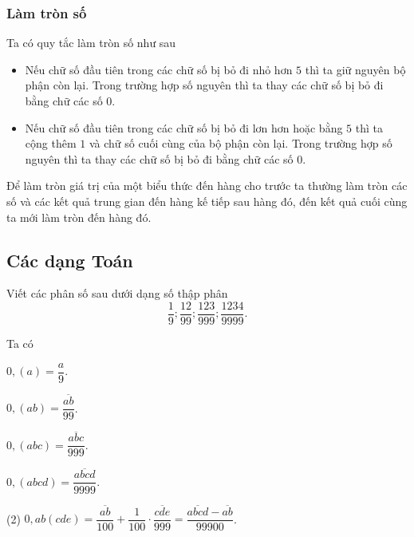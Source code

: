\subsubsection{Làm tròn số}
Ta có quy tắc làm tròn số như sau
\begin{itemize}
	\item Nếu chữ số đầu tiên trong các chữ số bị bỏ đi nhỏ hơn $ 5 $ thì ta giữ nguyên bộ phận còn lại. Trong trường hợp số nguyên thì ta thay các chữ số bị bỏ đi bằng chữ các số $ 0 $.
	\item Nếu chữ số đầu tiên trong các chữ số bị bỏ đi lơn hơn hoặc bằng $ 5 $ thì ta cộng thêm $ 1 $ và chữ số cuối cùng của bộ phận còn lại. Trong trường hợp số nguyên thì ta thay các chữ số bị bỏ đi bằng chữ các số $ 0 $.
\end{itemize}
\begin{note}
	Để làm tròn giá trị của một biểu thức đến hàng cho trước ta thường làm tròn các số và các kết quả trung gian đến hàng kế tiếp sau hàng đó, đến kết quả cuối cùng ta mới làm tròn đến hàng đó.
\end{note}

\subsection{Các dạng Toán}
\begin{vd}%
Viết các phân số sau dưới dạng số thập phân
	$$ \dfrac{1}{9};\dfrac{12}{99};\dfrac{123}{999};\dfrac{1234}{9999}. $$
\end{vd}

\begin{nx}
Ta có
\begin{enumEX}[$\bullet$]{3}
     \item $ 0{,}(a)=\dfrac{a}{9} $.
     \item $ 0{,}(ab)=\dfrac{\overline{ab}}{99} $.
     \item $ 0{,}(abc)=\dfrac{\overline{abc}}{999} $.
     \item $ 0{,}(abcd)=\dfrac{\overline{abcd}}{9999} $.
     \item*(2) $ 0{,}ab(cde)= \dfrac{\overline{ab}}{100}+\dfrac{1}{100}\cdot\dfrac{\overline{cde}}{999} = \dfrac{\overline{abcd}-\overline{ab}}{99900} $.
\end{enumEX}
\end{nx}

